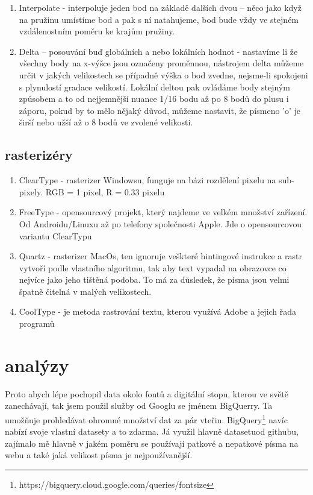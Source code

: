\documentclass[a4paper]{article}
\begin{document}
\begin{enumerate}
\begin{enumerate}
\item Interpolate - interpoluje jeden bod na základě dalších dvou – něco jako když na pružinu umístíme bod a pak s ní natahujeme, bod bude vždy ve stejném vzdálenostním poměru ke krajům pružiny.

\item Delta – posouvání buď globálních a nebo lokálních hodnot - nastavíme li že všechny body na x-výšce jsou označeny proměnnou, nástrojem delta můžeme určit v jakých velikostech se případně výška o bod zvedne, nejsme-li spokojeni s plynulostí gradace velikostí. Lokální deltou pak ovládáme body stejným způsobem a to od nejjemnější nuance 1/16 bodu až po 8 bodů do plusu i záporu, pokud by to mělo nějaký důvod, můžeme nastavit, že písmeno 'o' je širší nebo užší až o 8 bodů ve zvolené velikosti. 

\end{enumerate}

\subsection{rasterizéry}

\begin{enumerate}
\item ClearType - rasterizer Windowsu, funguje na bázi rozdělení pixelu na sub-pixely. RGB = 1 pixel, R = 0.33 pixelu

\item FreeType - opensourcový projekt, který najdeme ve velkém množství zařízení. Od Androidu/Linuxu až po telefony společnosti Apple. Jde o opensourcovou variantu ClearTypu

\item Quartz - rasterizer MacOs, ten ignoruje veškteré hintingové instrukce a rastr vytvoří podle vlastního algoritmu, tak aby text vypadal na obrazovce co nejvíce jako jeho tištěná podoba. To má za důsledek, že písma jsou velmi špatně čitelná v malých velikostech.

\item CoolType - je metoda rastrování textu, kterou využívá Adobe a jejich řada programů
\end{enumerate}

\section{analýzy}
Proto abych lépe pochopil data okolo fontů a digitální stopu, kterou ve světě zanechávají, tak jsem použil služby od Googlu se jménem BigQuerry. Ta umožňuje prohledávat ohromné množství dat za pár vteřin. BigQuery\footnote{https://bigquery.cloud.google.com/queries/fontsize} navíc nabízí svoje vlastní datasety a to zdarma. Já využil hlavně datasetuod githubu, zajímalo mě hlavně v jakém poměru se používají patkové a nepatkové písma na webu a také jaká velikost písma je nejpoužívanější.


\end{enumerate}
\end{document}
